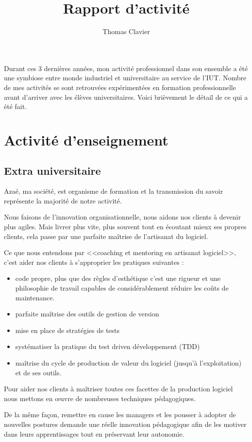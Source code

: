 \documentclass[a4paper]{article}
\title{Rapport d’activité}
\author{Thomas Clavier}
\begin{document}
\maketitle

Durant ces 3 dernières années, mon activité professionnel dans son ensemble a été une symbiose entre monde industriel et universitaire au service de l'IUT. 
Nombre de mes activités se sont retrouvées expérimentées en formation professionnelle avant d'arriver avec les élèves universitaires.
Voici brièvement le détail de ce qui a été fait.

\section{Activité d'enseignement}
\subsection{Extra universitaire}
Azaé, ma société, est organisme de formation et la transmission du savoir représente la majorité de notre activité.

Nous faisons de l'innovation organisationnelle, nous aidons nos clients à devenir plus agiles. Mais livrer plus vite, plus souvent tout en écoutant mieux ses propres clients, cela passe par une parfaite maîtrise de l'artisanat du logiciel.

Ce que nous entendons par <<coaching et mentoring en artisanat logiciel>>, c'est aider nos clients à s'approprier les pratiques suivantes : 
\begin{itemize}
  \item code propre, plus que des règles d'esthétique c'est une rigueur et une philosophie de travail capables de considérablement réduire les coûts de maintenance.
  \item parfaite maîtrise des outils de gestion de version
  \item mise en place de stratégies de tests 
  \item systématiser la pratique du test driven développement (TDD)
  \item maîtrise du cycle de production de valeur du logiciel (jusqu'à l'exploitation) et de ses outils.
\end{itemize}

Pour aider nos clients à maîtriser toutes ces facettes de la production logiciel nous mettons en œuvre de nombreuses techniques pédagogiques.

De la même façon, remettre en cause les managers et les pousser à adopter de nouvelles postures demande une réelle innovation pédagogique afin de les motiver dans leurs apprentissages tout en préservant leur autonomie. 
\end{document}
